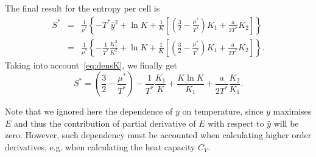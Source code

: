 \documentclass[12pt]{article}
\numberwithin{equation}{section}
\begin{document}
	The final result for the entropy per cell is
	\begin{eqnarray}
		S^{*} & = & \frac{1}{\rho^*} \left\{ -T^* \bar{y}^2 + \ln K + \frac{1}{K} \left[\left(\frac{3}{2} - \frac{\mu^*}{T^*} \right)K_1 + \frac{a}{2 T^*} K_2\right] \right\}
		\\
		& = & \frac{1}{\rho^*} \left\{ -\frac{1}{T^*} \frac{K_1^2}{K^2} + \ln K + \frac{1}{K} \left[\left(\frac{3}{2} - \frac{\mu^*}{T^*} \right)K_1 + \frac{a}{2 T^*} K_2\right] \right\}.
	\end{eqnarray}
	Taking into account~\eqref{eq:densK}, we finally get
	\begin{equation}
		S^* = \left(\frac{3}{2} - \frac{\mu^*}{T^*}\right) - \frac{1}{T^*}\frac{K_1}{K} + \frac{K \ln K}{K_1} + \frac{a}{2T^*} \frac{K_2}{K_1}.
	\end{equation}
	
	Note that we ignored here the dependence of $\bar{y}$ on temperature, since $\bar{y}$ maximises $E$ and thus the contribution of partial derivative of $E$ with respect to $\bar{y}$ will be zero. However, such dependency must be accounted when calculating higher order derivatives, e.g. when calculating the heat capacity $C_V$.
	
	

	
	
	
	
		
\end{document}
